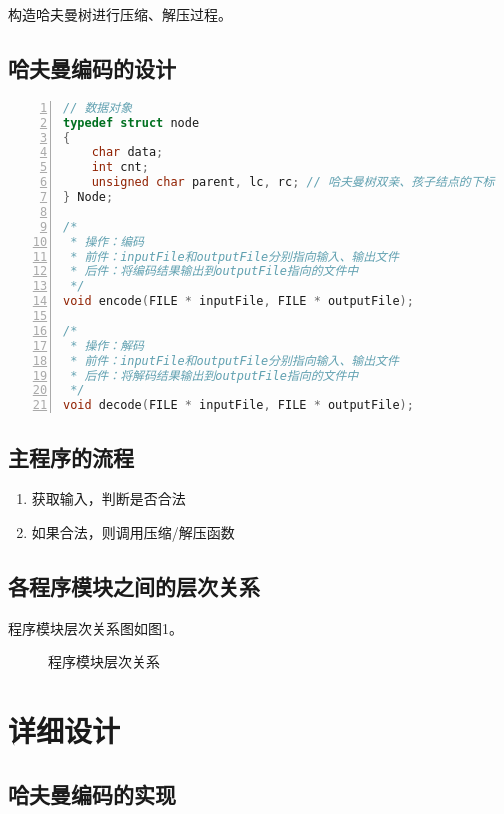 \documentclass{article}
\begin{document}
构造哈夫曼树进行压缩、解压过程。

\subsection{哈夫曼编码的设计}

\begin{lstlisting}[language={C},
    numbers=left,
    numberstyle=\tiny\consolas,
    basicstyle=\small\consolas]
// 数据对象
typedef struct node
{
    char data;
    int cnt;
    unsigned char parent, lc, rc; // 哈夫曼树双亲、孩子结点的下标
} Node;

/*
 * 操作：编码
 * 前件：inputFile和outputFile分别指向输入、输出文件
 * 后件：将编码结果输出到outputFile指向的文件中
 */
void encode(FILE * inputFile, FILE * outputFile);

/*
 * 操作：解码
 * 前件：inputFile和outputFile分别指向输入、输出文件
 * 后件：将解码结果输出到outputFile指向的文件中
 */
void decode(FILE * inputFile, FILE * outputFile);
\end{lstlisting}

\subsection{主程序的流程}

\begin{enumerate}
    \item 获取输入，判断是否合法
    \item 如果合法，则调用压缩/解压函数
\end{enumerate}

\subsection{各程序模块之间的层次关系}

程序模块层次关系图如图1。

\begin{figure}[htbp]


    \caption{程序模块层次关系}

\end{figure}

\section{详细设计}

\subsection{哈夫曼编码的实现}
\end{document}
